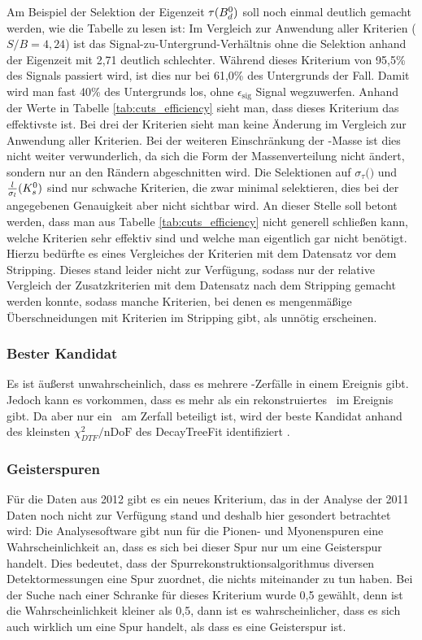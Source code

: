 Am Beispiel der Selektion der Eigenzeit $\tau(\text{$B_d^0$})$ soll noch einmal deutlich gemacht werden, wie die Tabelle zu lesen ist: Im Vergleich zur Anwendung aller Kriterien ($S/B=4,24$) ist das Signal-zu-Untergrund-Verhältnis ohne die Selektion anhand der Eigenzeit mit 2,71 deutlich schlechter. Während dieses Kriterium von 95,5\% des Signals passiert wird, ist dies nur bei 61,0\% des Untergrunds der Fall. Damit wird man fast 40\% des Untergrunds los, ohne $\epsilon_{\text{sig}}$ Signal wegzuwerfen. Anhand der Werte in Tabelle \ref{tab:cuts_efficiency} sieht man, dass dieses Kriterium das effektivste ist. Bei drei der Kriterien sieht man keine Änderung im Vergleich zur Anwendung aller Kriterien. Bei der weiteren Einschränkung der \Bd-Masse ist dies nicht weiter verwunderlich, da sich die Form der Massenverteilung nicht ändert, sondern nur an den Rändern abgeschnitten wird. Die Selektionen auf $\sigma_\tau($\Bd$)$ und $\frac{l}{\sigma_l}(K_s^0)$ sind nur schwache Kriterien, die zwar minimal selektieren, dies bei der angegebenen Genauigkeit aber nicht sichtbar wird. An dieser Stelle soll betont werden, dass man aus Tabelle \ref{tab:cuts_efficiency} nicht generell schließen kann, welche Kriterien sehr effektiv sind und welche man eigentlich gar nicht benötigt. Hierzu bedürfte es eines Vergleiches der Kriterien mit dem Datensatz vor dem Stripping. Dieses stand leider nicht zur Verfügung, sodass nur der relative Vergleich der Zusatzkriterien mit dem Datensatz nach dem Stripping gemacht werden konnte, sodass manche Kriterien, bei denen es mengenmäßige Überschneidungen mit Kriterien im Stripping gibt, als unnötig erscheinen.

\subsubsection{Bester Kandidat}
Es ist äußerst unwahrscheinlich, dass es mehrere \Decaychannel-Zerfälle in einem Ereignis gibt. Jedoch kann es vorkommen, dass es mehr als ein rekonstruiertes \Bd\ im Ereignis gibt. Da aber nur ein \Bd\ am Zerfall beteiligt ist, wird der beste Kandidat anhand des kleinsten $\chi^2_{DTF}/\text{nDoF}$ des DecayTreeFit identifiziert \cite{lhcb-paper}.

\subsubsection{Geisterspuren}
Für die Daten aus 2012 gibt es ein neues Kriterium, das in der Analyse der 2011 Daten \cite{lhcb-paper} noch nicht zur Verfügung stand und deshalb hier gesondert betrachtet wird: Die Analysesoftware gibt nun für die Pionen- und Myonenspuren eine Wahrscheinlichkeit an, dass es sich bei dieser Spur nur um eine Geisterspur handelt. Dies bedeutet, dass der Spurrekonstruktionsalgorithmus diversen Detektormessungen eine Spur zuordnet, die nichts miteinander zu tun haben. Bei der Suche nach einer Schranke für dieses Kriterium wurde 0,5 gewählt, denn ist die Wahrscheinlichkeit kleiner als 0,5, dann ist es wahrscheinlicher, dass es sich auch wirklich um eine Spur handelt, als dass es eine Geisterspur ist.


